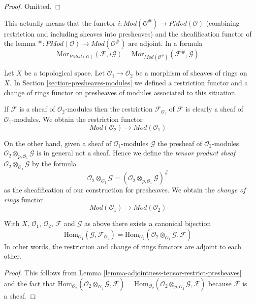 \begin{proof}
Omitted.
\end{proof}

\noindent
This actually means that the functor
$i : \textit{Mod}(\mathcal{O}^\#) \to \textit{PMod}(\mathcal{O})$
(combining restriction and including sheaves into presheaves)
and the sheafification functor of the lemma
${}^\# : \textit{PMod}(\mathcal{O}) \to \textit{Mod}(\mathcal{O}^\#)$
are adjoint. In a formula
$$
\text{Mor}_{\textit{PMod}(\mathcal{O})}(\mathcal{F}, i\mathcal{G})
=
\text{Mor}_{\textit{Mod}(\mathcal{O}^\#)}(\mathcal{F}^\#, \mathcal{G})
$$

\medskip\noindent
Let $X$ be a topological space.
Let $\mathcal{O}_1 \to \mathcal{O}_2$ be
a morphism of sheaves of rings on $X$.
In Section \ref{section-presheaves-modules}
we defined a restriction functor
and a change of rings functor on presheaves of modules
associated to this situation.

\medskip\noindent
If $\mathcal{F}$ is a sheaf of $\mathcal{O}_2$-modules
then the restriction $\mathcal{F}_{\mathcal{O}_1}$
of $\mathcal{F}$ is clearly a sheaf
of $\mathcal{O}_1$-modules. We obtain the restriction functor
$$
\textit{Mod}(\mathcal{O}_2)
\longrightarrow
\textit{Mod}(\mathcal{O}_1)
$$

\medskip\noindent
On the other hand, given a sheaf of $\mathcal{O}_1$-modules
$\mathcal{G}$ the presheaf of $\mathcal{O}_2$-modules
$\mathcal{O}_2 \otimes_{p,\mathcal{O}_1} \mathcal{G}$
is in general not a sheaf. Hence we define the
{\it tensor product sheaf}
$\mathcal{O}_2 \otimes_{\mathcal{O}_1} \mathcal{G}$
by the formula
$$
\mathcal{O}_2 \otimes_{\mathcal{O}_1} \mathcal{G}
=
(\mathcal{O}_2 \otimes_{p,\mathcal{O}_1} \mathcal{G})^\#
$$
as the sheafification of our construction for presheaves.
We obtain the {\it change of rings} functor
$$
\textit{Mod}(\mathcal{O}_1)
\longrightarrow
\textit{Mod}(\mathcal{O}_2)
$$

\begin{lemma}
\label{lemma-adjointness-tensor-restrict}
With $X$, $\mathcal{O}_1$, $\mathcal{O}_2$, $\mathcal{F}$ and
$\mathcal{G}$ as above there exists a canonical bijection
$$
\text{Hom}_{\mathcal{O}_1}(\mathcal{G}, \mathcal{F}_{\mathcal{O}_1})
=
\text{Hom}_{\mathcal{O}_2}(
\mathcal{O}_2 \otimes_{\mathcal{O}_1} \mathcal{G},
\mathcal{F}
)
$$
In other words, the restriction and change of rings functors
are adjoint to each other.
\end{lemma}

\begin{proof}
This follows from
Lemma \ref{lemma-adjointness-tensor-restrict-presheaves}
and the fact that
$\text{Hom}_{\mathcal{O}_2}(
\mathcal{O}_2 \otimes_{\mathcal{O}_1} \mathcal{G},
\mathcal{F}
)
=
\text{Hom}_{\mathcal{O}_2}(
\mathcal{O}_2 \otimes_{p, \mathcal{O}_1} \mathcal{G},
\mathcal{F}
)$
because $\mathcal{F}$ is a sheaf.
\end{proof}

